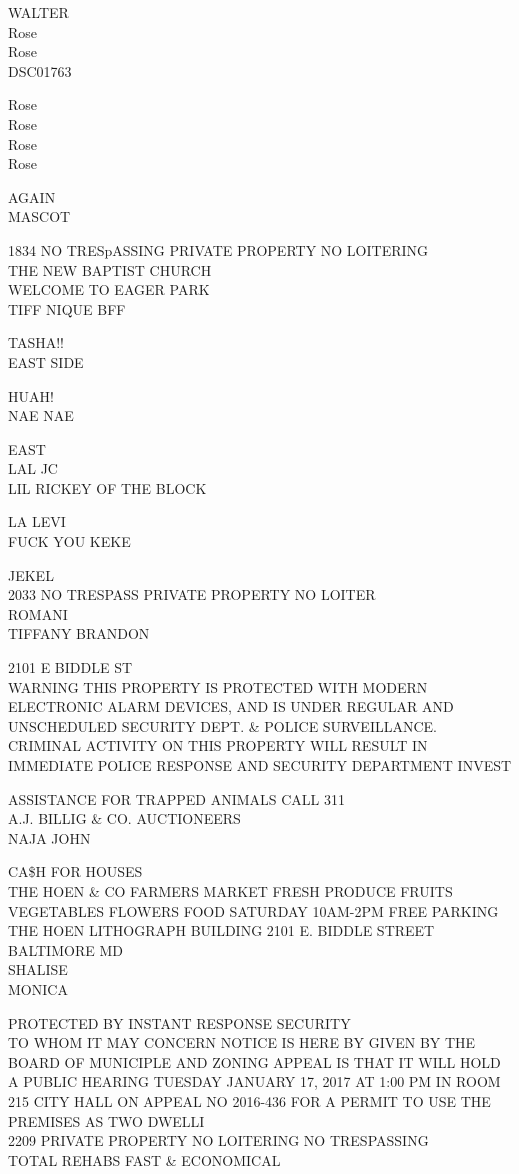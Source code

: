 \documentclass[10pt,letterpaper]{article}
\begin{document}
WALTER\\
Rose\\
Rose\\
DSC01763

Rose\\
Rose\\
Rose\\
Rose

AGAIN\\
MASCOT

1834 NO TRESpASSING PRIVATE PROPERTY NO LOITERING\\
THE NEW BAPTIST CHURCH\\
WELCOME TO EAGER PARK\\
TIFF NIQUE BFF

TASHA!!\\
EAST SIDE

HUAH!\\
NAE NAE

EAST\\
LAL JC\\
LIL RICKEY OF THE BLOCK

LA LEVI\\
FUCK YOU KEKE

JEKEL\\
2033 NO TRESPASS PRIVATE PROPERTY NO LOITER\\
ROMANI\\
TIFFANY BRANDON

2101 E BIDDLE ST\\
WARNING THIS PROPERTY IS PROTECTED WITH MODERN ELECTRONIC ALARM DEVICES, AND IS UNDER REGULAR AND UNSCHEDULED SECURITY DEPT. \& POLICE SURVEILLANCE.  CRIMINAL ACTIVITY ON THIS PROPERTY WILL RESULT IN IMMEDIATE POLICE RESPONSE AND SECURITY DEPARTMENT INVEST

ASSISTANCE FOR TRAPPED ANIMALS CALL 311\\
A.J. BILLIG \& CO. AUCTIONEERS\\
NAJA JOHN

CA\$H FOR HOUSES\\
THE HOEN \& CO FARMERS MARKET  FRESH PRODUCE FRUITS VEGETABLES FLOWERS FOOD SATURDAY 10AM{-}2PM FREE PARKING THE HOEN LITHOGRAPH BUILDING 2101 E. BIDDLE STREET BALTIMORE MD\\
SHALISE\\
MONICA

PROTECTED BY INSTANT RESPONSE SECURITY\\
TO WHOM IT MAY CONCERN NOTICE IS HERE BY GIVEN BY THE BOARD OF MUNICIPLE AND ZONING APPEAL IS THAT IT WILL HOLD A PUBLIC HEARING TUESDAY JANUARY 17, 2017 AT 1:00 PM IN ROOM 215 CITY HALL ON APPEAL NO 2016{-}436 FOR A PERMIT TO USE THE PREMISES AS TWO DWELLI\\
2209 PRIVATE PROPERTY NO LOITERING NO TRESPASSING\\
TOTAL REHABS FAST \& ECONOMICAL
\end{document}
